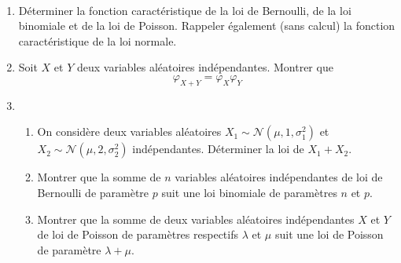 \begin{td-exo}[]\, %
    \begin{enumerate}
        \item Déterminer la fonction caractéristique de la loi
        de Bernoulli, de la loi binomiale et de la loi de
        Poisson. Rappeler également (sans calcul) la
        fonction caractéristique de la loi normale.

        \item Soit \(X\) et \(Y\) deux variables aléatoires
        indépendantes. Montrer que
        \begin{equation*}
            \varphi_{X+Y} = \varphi_X\varphi_Y
        \end{equation*}

        \item \,
        \begin{enumerate}
            \item On considère deux variables aléatoires 
            \(X_1 \sim \mathcal N(\mu,1,\sigma_1^2)\) et
            \(X_2 \sim \mathcal N(\mu,2,\sigma_2^2)\) indépendantes.
            Déterminer la loi de \(X_1 + X_2\).

            \item Montrer que la somme de \(n\) variables aléatoires
            indépendantes de loi de Bernoulli de paramètre \(p\)
            suit une loi binomiale de paramètres \(n\) et \(p\).

            \item Montrer que la somme de deux variables aléatoires
            indépendantes \(X\) et \(Y\) de loi de Poisson de paramètres
            respectifs \(\lambda\) et \(\mu\) suit une loi de Poisson
            de paramètre \(\lambda + \mu\).
        \end{enumerate}

    \end{enumerate}
\end{td-exo}
